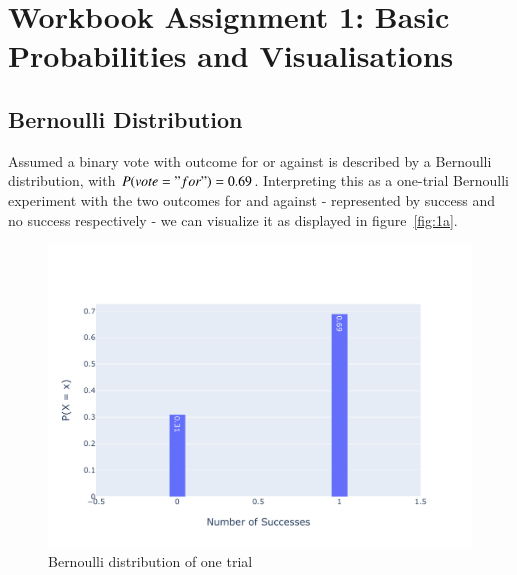 \chapter{Workbook Assignment 1: Basic Probabilities and Visualisations}

\section{Bernoulli Distribution}

Assumed a binary vote with outcome for or against is described by a Bernoulli distribution, with $P(vote = "for") = 0.69$. 
Interpreting this as a one-trial Bernoulli experiment with the two outcomes for and against - represented by success and no success respectively - we can visualize it as displayed in figure~\eqref{fig:1a}.


\begin{figure}[h]
\centering
\includegraphics[width=16cm]{pics/1a.pdf}
\caption{Bernoulli distribution of one trial}
\label{fig:1a}
\end{figure}
\FloatBarrier


